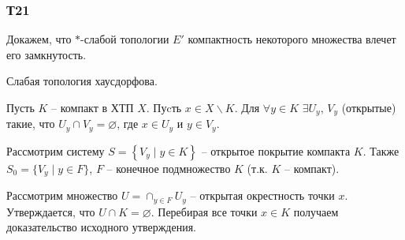 \subsubsection*{Т21}

Докажем, что $*$-слабой топологии $E'$ компактность некоторого множества влечет его замкнутость. 

\begin{to_lem}
    Слабая топология хаусдорфова.
\end{to_lem}


Пусть $K$ -- компакт в ХТП $X$. Пуcть $x \in X \backslash K$. Для $\forall y \in K$ $\exists U_y,\, V_y$ (открытые) такие, что $U_y \cap V_y = \varnothing$, где $x \in U_y$ и $y \in V_y$. 

Рассмотрим систему $S = \left\{V_y \mid y \in K\right\}$
-- открытое покрытие компакта $K$. Также $S_0 = \{V_y \mid y \in F\}$, $F$ -- конечное подмножество $K$ (т.к. $K$ -- компакт). 

Рассмотрим множество $U = \cap_{y\in F} U_y$ -- открытая окрестность точки $x$. Утверждается, что $U \cap K = \varnothing$. Перебирая все точки $x \in K$ получаем доказательство исходного утверждения.  